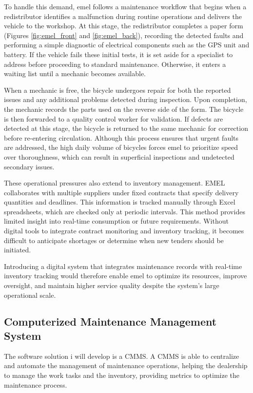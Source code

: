 To handle this demand, \ac{emel} follows a maintenance workflow that begins when a redistributor identifies a malfunction during routine operations and delivers the vehicle to the workshop. At this stage, the redistributor completes a paper form (Figures \ref{fig:emel_front} and \ref{fig:emel_back}), recording the detected faults and performing a simple diagnostic of electrical components such as the GPS unit and battery. If the vehicle fails these initial tests, it is set aside for a specialist to address before proceeding to standard maintenance. Otherwise, it enters a waiting list until a mechanic becomes available.

When a mechanic is free, the bicycle undergoes repair for both the reported issues and any additional problems detected during inspection. Upon completion, the mechanic records the parts used on the reverse side of the form. The bicycle is then forwarded to a quality control worker for validation. If defects are detected at this stage, the bicycle is returned to the same mechanic for correction before re-entering circulation. Although this process ensures that urgent faults are addressed, the high daily volume of bicycles forces \ac{emel} to prioritize speed over thoroughness, which can result in superficial inspections and undetected secondary issues.

These operational pressures also extend to inventory management. \ac{EMEL} collaborates with multiple suppliers under fixed contracts that specify delivery quantities and deadlines. This information is tracked manually through Excel spreadsheets, which are checked only at periodic intervals. This method provides limited insight into real-time consumption or future requirements. Without digital tools to integrate contract monitoring and inventory tracking, it becomes difficult to anticipate shortages or determine when new tenders should be initiated.

Introducing a digital system that integrates maintenance records with real-time inventory tracking would therefore enable \ac{emel} to optimize its resources, improve oversight, and maintain higher service quality despite the system's large operational scale.


\subsection{Computerized Maintenance Management System}

The software solution i will develop is a \ac{CMMS}.
A \ac{CMMS} is able to centralize and automate the management of maintenance operations, helping the dealership to manage the work tasks and the inventory, providing metrics to optimize the maintenance process.

